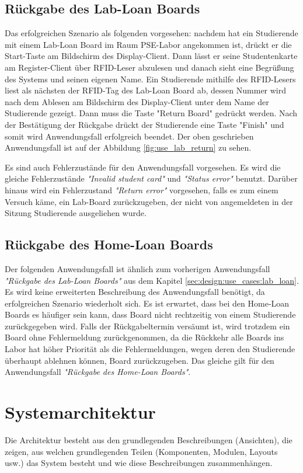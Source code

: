 \subsection{Rückgabe des Lab-Loan Boards}
\label{sec:design:use_cases:lab_return}
Das erfolgreichen Szenario als folgenden vorgesehen: nachdem hat ein Studierende mit einem Lab-Loan Board im Raum PSE-Labor angekommen ist, drückt er die Start-Taste am Bildschirm des Display-Client. Dann lässt er seine Studentenkarte am Register-Client über RFID-Leser abzulesen und danach sieht eine Begrüßung des Systems und seinen eigenen Name. Ein Studierende mithilfe des RFID-Lesers liest als nächsten der RFID-Tag des Lab-Loan Board ab, dessen Nummer wird nach dem Ablesen am Bildschirm des Display-Client unter dem Name der Studierende gezeigt. Dann muss die Taste "Return Board" gedrückt werden. Nach der Bestätigung der Rückgabe drückt der Studierende eine Taste "Finish" und somit wird Anwendungsfall erfolgreich beendet. Der oben geschrieben Anwendungsfall ist auf der Abbildung \ref{fig:use_lab_return} zu sehen.

Es sind auch Fehlerzustände für den Anwendungsfall vorgesehen. Es wird die gleiche Fehlerzustände \textit{"Invalid student card"} und \textit{"Status error"} benutzt. Darüber hinaus wird ein Fehlerzustand  \textit{"Return error"} vorgesehen, falls es zum einem Versuch käme, ein Lab-Board zurückzugeben, der nicht von angemeldeten in der Sitzung Studierende ausgeliehen wurde. 

\subsection{Rückgabe des Home-Loan Boards}
\label{sec:design:use_cases:home_return}
Der folgenden Anwendungsfall ist ähnlich zum vorherigen Anwendungsfall \textit{"Rückgabe des Lab-Loan Boards"} aus dem Kapitel \ref{sec:design:use_cases:lab_loan}. Es wird keine erweiterten Beschreibung des Anwendungsfall benötigt, da erfolgreichen Szenario wiederholt sich. Es ist erwartet, dass bei den Home-Loan Boards es häufiger sein kann, dass Board nicht rechtzeitig von einem Studierende zurückgegeben wird. Falls der Rückgabeltermin versäumt ist, wird trotzdem ein Board ohne Fehlermeldung zurückgenommen, da die Rückkehr alle Boards ins Labor hat höher Priorität als die Fehlermeldungen, wegen deren den Studierende überhaupt ablehnen können, Board zurückzugeben. Das gleiche gilt für den Anwendungsfall \textit{"Rückgabe des Home-Loan Boards"}. 

\section{Systemarchitektur}
\label{sec:design:uml}
Die Architektur besteht aus den grundlegenden Beschreibungen (Ansichten),  die zeigen, aus welchen grundlegenden Teilen (Komponenten, Modulen, Layouts usw.) das System besteht und wie diese Beschreibungen zusammenhängen. 

